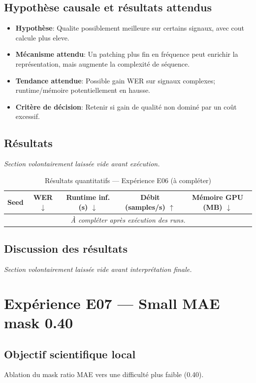 \documentclass[11pt,a4paper]{article}
\begin{document}
\subsection{Hypothèse causale et résultats attendus}
\begin{itemize}[leftmargin=1.2cm]
\item \textbf{Hypothèse}: Qualite possiblement meilleure sur certains signaux, avec cout calcule plus eleve.
\item \textbf{Mécanisme attendu}: Un patching plus fin en fréquence peut enrichir la représentation, mais augmente la complexité de séquence.
\item \textbf{Tendance attendue}: Possible gain WER sur signaux complexes; runtime/mémoire potentiellement en hausse.
\item \textbf{Critère de décision}: Retenir si gain de qualité non dominé par un coût excessif.
\end{itemize}

\subsection{Résultats}
\textit{Section volontairement laissée vide avant exécution.}

\begin{table}[H]
\centering
\caption{Résultats quantitatifs --- Expérience E06 (à compléter)}
\begin{tabular}{lcccc}
\toprule
Seed & WER $\downarrow$ & Runtime inf. (s) $\downarrow$ & Débit (samples/s) $\uparrow$ & Mémoire GPU (MB) $\downarrow$ \\
\midrule
\multicolumn{5}{c}{\textit{À compléter après exécution des runs.}} \\
\bottomrule
\end{tabular}
\end{table}

\subsection{Discussion des résultats}
\textit{Section volontairement laissée vide avant interprétation finale.}


\section{Expérience E07 --- Small MAE mask 0.40}
\subsection{Objectif scientifique local}
Ablation du mask ratio MAE vers une difficulté plus faible (0.40).
\end{document}
